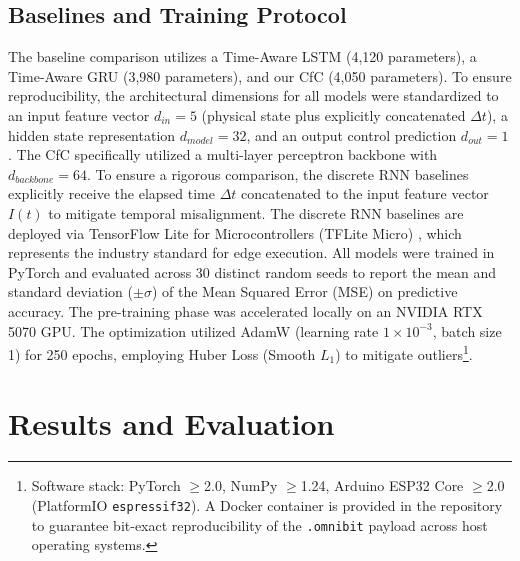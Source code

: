 \documentclass[conference]{IEEEtran}
\begin{document}
\subsection{Baselines and Training Protocol}
The baseline comparison utilizes a Time-Aware LSTM (4,120 parameters), a Time-Aware GRU (3,980 parameters), and our CfC (4,050 parameters). To ensure reproducibility, the architectural dimensions for all models were standardized to an input feature vector $d_{in} = 5$ (physical state plus explicitly concatenated $\Delta t$), a hidden state representation $d_{model} = 32$, and an output control prediction $d_{out} = 1$. The CfC specifically utilized a multi-layer perceptron backbone with $d_{backbone} = 64$. To ensure a rigorous comparison, the discrete RNN baselines explicitly receive the elapsed time $\Delta t$ concatenated to the input feature vector $I(t)$ to mitigate temporal misalignment. The discrete RNN baselines are deployed via TensorFlow Lite for Microcontrollers (TFLite Micro) \cite{david2021tflitemicro}, which represents the industry standard for edge execution. All models were trained in PyTorch and evaluated across 30 distinct random seeds to report the mean and standard deviation ($\pm \sigma$) of the Mean Squared Error (MSE) on predictive accuracy. The pre-training phase was accelerated locally on an NVIDIA RTX 5070 GPU. The optimization utilized AdamW \cite{kingma2014adam, loshchilov2017decoupled} (learning rate $1\times10^{-3}$, batch size 1) for 250 epochs, employing Huber Loss (Smooth $L_1$) to mitigate outliers\footnote{Software stack: PyTorch $\geq$2.0, NumPy $\geq$1.24, Arduino ESP32 Core $\geq$2.0 (PlatformIO \texttt{espressif32}). A Docker container is provided in the repository to guarantee bit-exact reproducibility of the \texttt{.omnibit} payload across host operating systems.}.

\section{Results and Evaluation}
\end{document}
